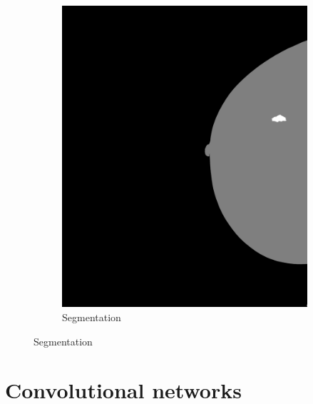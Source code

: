 \documentclass{beamer}
\begin{document}
\begin{frame}
\begin{figure}[h]
\begin{subfigure}{0.35\textwidth}
				\includegraphics[width=\textwidth]{plots/label.png}
				\caption{Segmentation}
			\end{subfigure}
		\end{figure}
	\end{frame}
	
	
	\section[Convolutional networks]{Convolutional networks}
\end{document}
